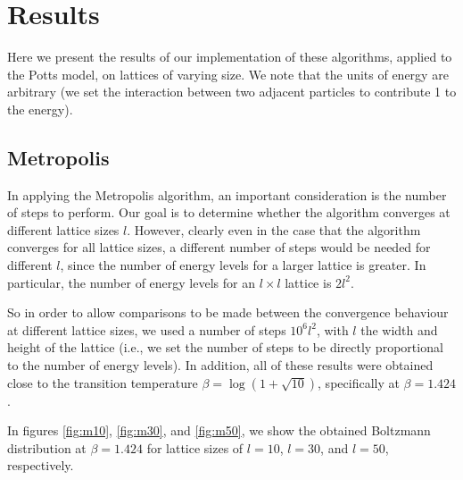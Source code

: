 \documentclass{article}
\begin{document}
\section{Results}
Here we present the results of our implementation of these algorithms, applied to the Potts model, on lattices of varying size.
We note that the units of energy are arbitrary (we set the interaction between two adjacent particles to contribute 1 to the energy).

\subsection{Metropolis}
\label{sec:metropolis}
In applying the Metropolis algorithm, an important consideration is the number of steps to perform.
Our goal is to determine whether the algorithm converges at different lattice sizes $l$.
However, clearly even in the case that the algorithm converges for all lattice sizes, a different number of steps would be needed for different $l$, since the number of energy levels for a larger lattice is greater.
In particular, the number of energy levels for an $l\times l$ lattice is $2l^2$.

So in order to allow comparisons to be made between the convergence behaviour at different lattice sizes, we used a number of steps $10^6l^2$, with $l$ the width and height of the lattice (i.e., we set the number of steps to be directly proportional to the number of energy levels).
In addition, all of these results were obtained close to the transition temperature $\beta = \log(1+\sqrt{10})$, specifically at $\beta = 1.424$.

In figures \ref{fig:m10}, \ref{fig:m30}, and \ref{fig:m50}, we show the obtained Boltzmann distribution at $\beta = 1.424$ for lattice sizes of $l = 10$, $l = 30$, and $l = 50$, respectively.
\end{document}

